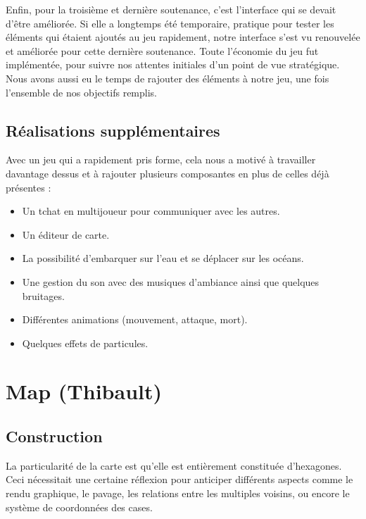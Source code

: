 \documentclass[12pt]{report}
\begin{document}
\newpage

Enfin, pour la troisième et dernière soutenance, c'est l'interface qui se devait
d'être améliorée. Si elle a longtemps été temporaire, pratique pour tester les
éléments qui étaient ajoutés au jeu rapidement, notre interface s'est vu
renouvelée et améliorée pour cette dernière soutenance. Toute l'économie du jeu
fut implémentée, pour suivre nos attentes initiales d'un point de vue
stratégique. Nous avons aussi eu le temps de rajouter des éléments à notre jeu,
une fois l'ensemble de nos objectifs remplis.

\section{Réalisations supplémentaires}

Avec un jeu qui a rapidement pris forme, cela nous a motivé à travailler
davantage dessus et à rajouter plusieurs composantes en plus de celles déjà
présentes :

\begin{itemize}
    \item Un tchat en multijoueur pour communiquer avec les autres.
    \item Un éditeur de carte.
    \item La possibilité d'embarquer sur l'eau et se déplacer sur les océans.
    \item Une gestion du son avec des musiques d'ambiance ainsi que quelques
        bruitages.
    \item Différentes animations (mouvement, attaque, mort).
    \item Quelques effets de particules.
\end{itemize}

\chapter{Map (Thibault)}

\section{Construction}

La particularité de la carte est qu’elle est entièrement constituée d’hexagones.
Ceci nécessitait une certaine réflexion pour anticiper différents aspects comme
le rendu graphique, le pavage, les relations entre les multiples voisins, ou
encore le système de coordonnées des cases.
\end{document}

